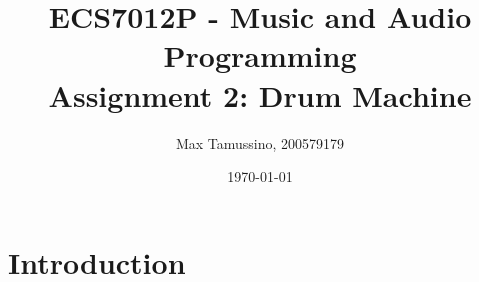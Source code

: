 \documentclass[a4paper, 12pt]{article}
\title{ECS7012P - Music and Audio Programming\\
	   Assignment 2: Drum Machine}
\author{
  Max Tamussino, 200579179
}
\date{\today}
\begin{document}
\maketitle
\tableofcontents
\pagebreak

\section{Introduction} \label{sec:intro}


\sloppy
\printbibliography
\end{document}
